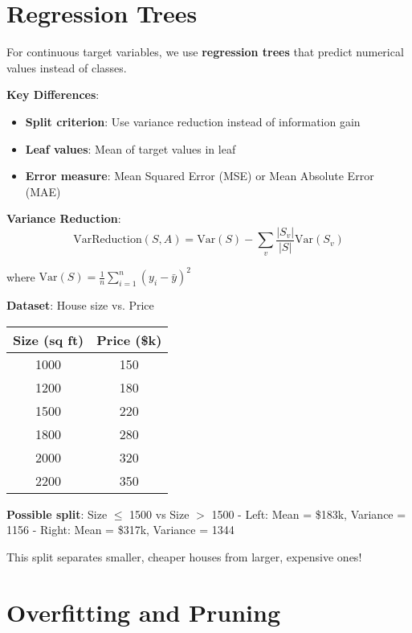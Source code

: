 \documentclass{article}
\newcounter{example}
\begin{document}
\section{Regression Trees}

For continuous target variables, we use \textbf{regression trees} that predict numerical values instead of classes.

\textbf{Key Differences}:
\begin{itemize}
    \item \textbf{Split criterion}: Use variance reduction instead of information gain
    \item \textbf{Leaf values}: Mean of target values in leaf
    \item \textbf{Error measure}: Mean Squared Error (MSE) or Mean Absolute Error (MAE)
\end{itemize}

\textbf{Variance Reduction}:
$$\text{VarReduction}(S, A) = \text{Var}(S) - \sum_{v} \frac{|S_v|}{|S|} \text{Var}(S_v)$$

where $\text{Var}(S) = \frac{1}{n}\sum_{i=1}^n (y_i - \bar{y})^2$

\begin{tcolorbox}[colback=orange!5!white,colframe=orange!75!black,title=Example \stepcounter{example}\#\theexample: Predicting House Prices]

\textbf{Dataset}: House size vs. Price
\begin{center}
\begin{tabular}{|c|c|}
\hline
\textbf{Size (sq ft)} & \textbf{Price (\$k)} \\
\hline
1000 & 150 \\
1200 & 180 \\
1500 & 220 \\
1800 & 280 \\
2000 & 320 \\
2200 & 350 \\
\hline
\end{tabular}
\end{center}

\textbf{Possible split}: Size $\leq$ 1500 vs Size $>$ 1500
- Left: Mean = \$183k, Variance = 1156
- Right: Mean = \$317k, Variance = 1344

This split separates smaller, cheaper houses from larger, expensive ones!
\end{tcolorbox}

\section{Overfitting and Pruning}
\end{document}
